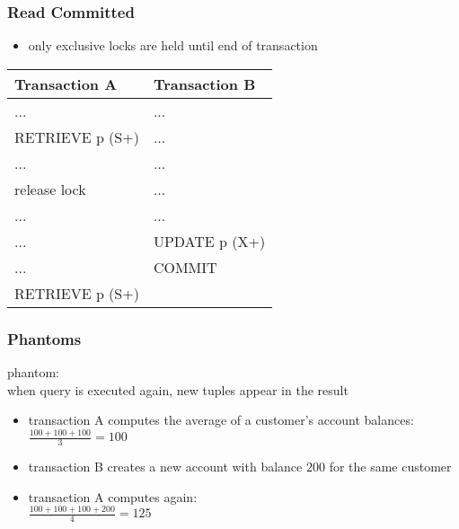 \documentclass[dvipsnames]{beamer}
\theoremstyle{plain}
\begin{document}
\begin{frame}[fragile]
  \frametitle{Read Committed}

  \begin{itemize}
    \item only exclusive locks are held until end of transaction
  \end{itemize}

  \begin{example}
    \begin{table}
      \begin{tabular}{ll}
Transaction A   & Transaction B\\\hline
...             & ...          \\\pause
RETRIEVE p (S+) & ...          \\\pause
...             & ...          \\
release lock    & ...          \\\pause
...             & ...          \\
...             & UPDATE p (X+)\\
...             & COMMIT       \\\pause
RETRIEVE p (S+) &
      \end{tabular}
    \end{table}
  \end{example}
\end{frame}

\begin{frame}
  \frametitle{Phantoms}

  \begin{definition}
    \alert{phantom}:\\
      when query is executed again, new tuples appear in the result
  \end{definition}

  \pause
  \begin{example}
    \begin{itemize}
      \item transaction A computes the average of a customer's account
        balances:\\
        $\frac{100+100+100}{3}=100$

      \pause
      \item transaction B creates a new account with balance $200$ for the same
        customer
      \item transaction A computes again:\\
        $\frac{100+100+100+200}{4}=125$
    \end{itemize}
  \end{example}
\end{frame}
\end{document}
